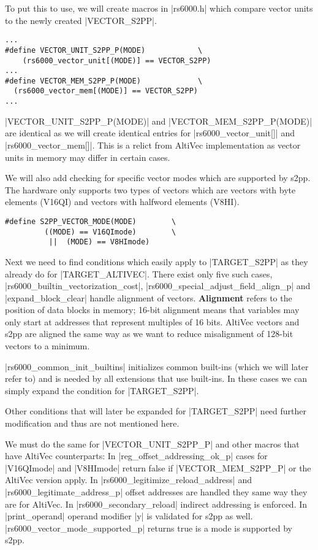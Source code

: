 To put this to use, we will create macros in |rs6000.h| which compare vector units to the newly created |VECTOR_S2PP|.
\begin{lstlisting}
...
#define VECTOR_UNIT_S2PP_P(MODE)            \
    (rs6000_vector_unit[(MODE)] == VECTOR_S2PP)
...
#define VECTOR_MEM_S2PP_P(MODE)             \
  (rs6000_vector_mem[(MODE)] == VECTOR_S2PP)
...
\end{lstlisting}

|VECTOR_UNIT_S2PP_P(MODE)| and |VECTOR_MEM_S2PP_P(MODE)| are identical as we will create identical entries for |rs6000_vector_unit[]| and |rs6000_vector_mem[]|.
This is a relict from AltiVec implementation as vector units in memory may differ in certain cases. 

We will also add checking for specific vector modes which are supported by s2pp.
The hardware only supports two types of vectors which are vectors with byte elements (V16QI) and vectors with halfword elements (V8HI).
\begin{lstlisting}
#define S2PP_VECTOR_MODE(MODE)        \
         ((MODE) == V16QImode)        \
          ||  (MODE) == V8HImode)
\end{lstlisting}

Next we need to find conditions which easily apply to |TARGET_S2PP| as they already do for |TARGET_ALTIVEC|.
There exist only five such cases, |rs6000_builtin_vectorization_cost|, |rs6000_special_adjust_field_align_p| and |expand_block_clear| handle alignment of vectors.
\textbf{Alignment} refers to the position of data blocks in memory; 16-bit alignment means that variables may only start at addresses that represent multiples of 16 bits.
AltiVec vectors and s2pp are aligned the same way as we want to reduce misalignment of 128-bit vectors to a minimum.

|rs6000_common_init_builtins| initializes common built-ins (which we will later refer to) and is needed by all extensions that use built-ins.
In these cases we can simply expand the condition for |TARGET_S2PP|.

Other conditions that will later be expanded for |TARGET_S2PP| need further modification and thus are not mentioned here.

We must do the same for |VECTOR_UNIT_S2PP_P| and other macros that have AltiVec counterparts:
In |reg_offset_addressing_ok_p| cases for |V16QImode| and |V8HImode| return false if |VECTOR_MEM_S2PP_P| or the AltiVec version apply.
In |rs6000_legitimize_reload_address| and |rs6000_legitimate_address_p| offset addresses are handled they same way they are for AltiVec.
In |rs6000_secondary_reload| indirect addressing is enforced.
In |print_operand| operand modifier |y| is validated for s2pp as well.
|rs6000_vector_mode_supported_p| returns true is a mode is supported by s2pp.


